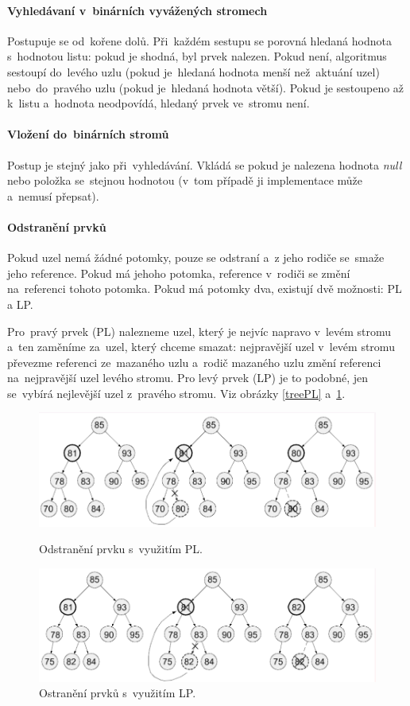 \paragraph{Vyhledávaní v~binárních vyvážených stromech} Postupuje se od~kořene dolů. Při~každém sestupu se porovná hledaná hodnota s~hodnotou listu: pokud je shodná, byl prvek nalezen. Pokud není, algoritmus sestoupí do~levého uzlu (pokud je~hledaná hodnota menší než~aktuání uzel) nebo~do~pravého uzlu (pokud je~hledaná hodnota větší). Pokud je sestoupeno až k~listu a~hodnota neodpovídá, hledaný prvek ve~stromu není.

\paragraph{Vložení do~binárních stromů} Postup je stejný jako při~vyhledávání. Vkládá se pokud je nalezena hodnota \emph{null} nebo položka se~stejnou hodnotou (v~tom případě ji implementace může a~nemusí přepsat).

\paragraph{Odstranění prvků} Pokud uzel nemá žádné potomky, pouze se odstraní a~z jeho rodiče se~smaže jeho reference. Pokud má jehoho potomka, reference v~rodiči se změní na~referenci tohoto potomka. Pokud má potomky dva, existují dvě možnosti: PL a LP.

Pro~pravý prvek (PL) nalezneme uzel, který je nejvíc napravo v~levém stromu a~ten zaměníme za~uzel, který chceme smazat: nejpravější uzel v~levém stromu převezme referenci ze~mazaného uzlu a~rodič mazaného uzlu změní referenci na~nejpravější uzel levého stromu. Pro levý prvek (LP) je to podobné, jen se~vybírá nejlevější uzel z~pravého stromu. Viz obrázky \ref{treePL} a~\ref{treeLP}.

\begin{figure}[ht]
	\centering
	\includegraphics[scale=0.8]{images/treePL.PNG}
	\caption{Odstranění prvku s~využitím PL.}
	\label{treePL}

	\includegraphics[scale=0.8]{images/treeLP.PNG}
	\caption{Ostranění prvků s~využitím LP.}
	\label{treeLP}
\end{figure}

